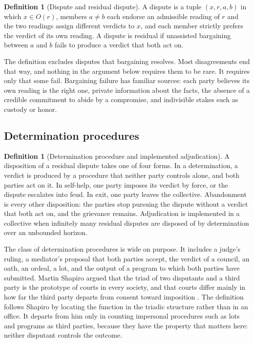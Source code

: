 \documentclass[11pt,letterpaper]{article}
\theoremstyle{definition}
\newtheorem{definition}[theorem]{Definition}
\theoremstyle{remark}
\begin{document}
\begin{definition}[Dispute and residual dispute]
\label{def:judicial-power:dispute}
A dispute is a tuple $(x,r,a,b)$ in which $x\in O(r)$, members $a\neq b$ each endorse an admissible reading of $r$ and the two readings assign different verdicts to $x$, and each member strictly prefers the verdict of its own reading. A dispute is residual if unassisted bargaining between $a$ and $b$ fails to produce a verdict that both act on.
\end{definition}

The definition excludes disputes that bargaining resolves. Most disagreements end that way, and nothing in the argument below requires them to be rare. It requires only that some fail. Bargaining failure has familiar sources: each party believes its own reading is the right one, private information about the facts, the absence of a credible commitment to abide by a compromise, and indivisible stakes such as custody or honor.

\subsection{Determination procedures}

\begin{definition}[Determination procedure and implemented adjudication]
\label{def:judicial-power:determination}
A disposition of a residual dispute takes one of four forms. In a determination, a verdict is produced by a procedure that neither party controls alone, and both parties act on it. In self-help, one party imposes its verdict by force, or the dispute escalates into feud. In exit, one party leaves the collective. Abandonment is every other disposition: the parties stop pursuing the dispute without a verdict that both act on, and the grievance remains. Adjudication is implemented in a collective when infinitely many residual disputes are disposed of by determination over an unbounded horizon.
\end{definition}

The class of determination procedures is wide on purpose. It includes a judge's ruling, a mediator's proposal that both parties accept, the verdict of a council, an oath, an ordeal, a lot, and the output of a program to which both parties have submitted. Martin Shapiro argued that the triad of two disputants and a third party is the prototype of courts in every society, and that courts differ mainly in how far the third party departs from consent toward imposition \citep{shapiro1981}. The definition follows Shapiro by locating the function in the triadic structure rather than in an office. It departs from him only in counting impersonal procedures such as lots and programs as third parties, because they have the property that matters here: neither disputant controls the outcome.
\end{document}
